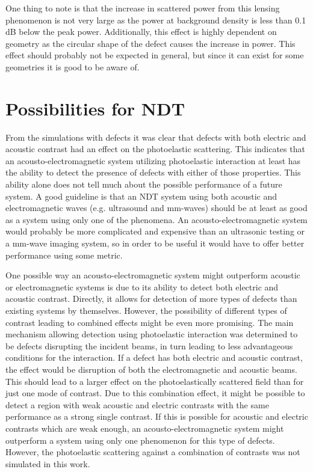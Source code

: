 \documentclass[11pt,twoside]{eitExjobb}
\begin{document}
	One thing to note is that the increase in scattered power from this lensing phenomenon is not very large as the power at background density is less than 0.1 dB below the peak power. Additionally, this effect is highly dependent on geometry as the circular shape of the defect causes the increase in power. This effect should probably not be expected in general, but since it can exist for some geometries it is good to be aware of.
	
%			
	
	\section{Possibilities for NDT}
	From the simulations with defects it was clear that defects with both electric and acoustic contrast had an effect on the photoelastic scattering. This indicates that an acousto-electromagnetic system utilizing photoelastic interaction at least has the ability to detect the presence of defects with either of those properties. This ability alone does not tell much about the possible performance of a future system. A good guideline is that an NDT system using both acoustic and electromagnetic waves (e.g. ultrasound and mm-waves) should be at least as good as a system using only one of the phenomena. An acousto-electromagnetic system would probably be more complicated and expensive than an ultrasonic testing or a mm-wave imaging system, so in order to be useful it would have to offer better performance using some metric.
	
	One possible way an acousto-electromagnetic system might outperform acoustic or electromagnetic systems is due to its ability to detect both electric and acoustic contrast. Directly, it allows for detection of more types of defects than existing systems by themselves. However, the possibility of different types of contrast leading to combined effects might be even more promising. The main mechanism allowing detection using photoelastic interaction was determined to be defects disrupting the incident beams, in turn leading to less advantageous conditions for the interaction. If a defect has both electric and acoustic contrast, the effect would be disruption of both the electromagnetic and acoustic beams. This should lead to a larger effect on the photoelastically scattered field than for just one mode of contrast. Due to this combination effect, it might be possible to detect a region with weak acoustic and electric contrasts with the same performance as a strong single contrast. If this is possible for acoustic and electric contrasts which are weak enough, an acousto-electromagnetic system might outperform a system using only one phenomenon for this type of defects. However, the photoelastic scattering against a combination of contrasts was not simulated in this work.
	
\end{document}
